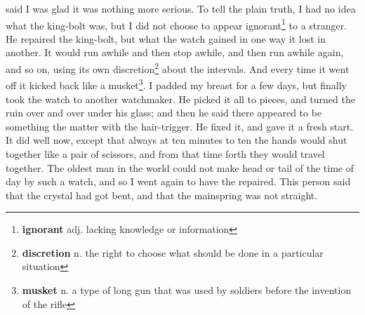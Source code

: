 said I was glad it was nothing more serious. To tell the plain truth, I had no idea what the king-bolt was, but I did not choose to appear ignorant\footnote{\textbf{ignorant} adj. lacking knowledge or information} to a stranger. He repaired the king-bolt, but what the watch gained in one way it lost in another. It would run awhile and then stop awhile, and then run awhile again, and so on, using its own discretion\footnote{\textbf{discretion} n. the right to choose what should be done in a particular situation} about the intervals. And every time it went off it kicked back like a musket\footnote{\textbf{musket} n. a type of long gun that was used by soldiers before the invention of the rifle}. I padded my breast for a few days, but finally took the watch to another watchmaker. He picked it all to pieces, and turned the ruin over and over under his glass; and then he said there appeared to be something the matter with the hair-trigger. He fixed it, and gave it a fresh start. It did well now, except that always at ten minutes to ten the hands would shut together like a pair of scissors, and from that time forth they would travel together. The oldest man in the world could not make head or tail of the time of day by such a watch, and so I went again to have the repaired. This person said that the crystal had got bent, and that the mainspring was not straight.

